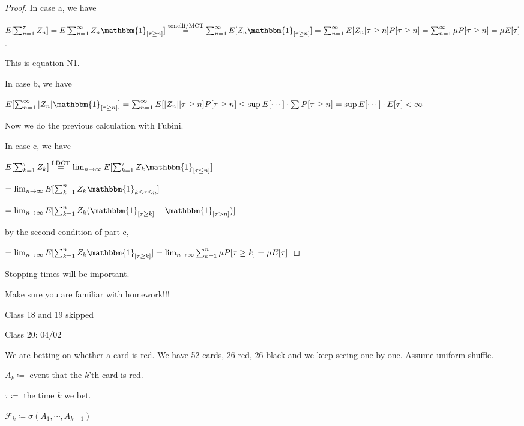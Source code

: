 \documentclass{article}
\theoremstyle{definition}
\begin{document}
\begin{proof}
    In case a, we have

    \(E[\sum_{n=1}^{\tau} Z_n] = E[\sum_{n=1}^{\infty} Z_n \mathbbm{1}_{[\tau \geq n]}]\overset{\text{tonelli/MCT}}{=} \sum_{n=1}^{\infty} E[Z_n \mathbbm{1}_{[\tau \geq n]} ]=\sum_{n=1}^{\infty} E[Z_n|\tau \geq n]P[\tau \geq n]=\sum_{n=1}^{\infty} \mu P[\tau \geq n] = \mu E[\tau]\).

    This is equation N1.

    In case b, we have

    \(E[\sum_{n=1}^{\infty} \vert Z_n \vert \mathbbm{1}_{[\tau \geq n]}]=\sum_{n=1}^{\infty} E[\vert Z_n \vert | \tau \geq n]P[\tau \geq n]\leq \sup E[\cdots] \cdot \sum P[\tau \geq n] = \sup E[\cdots]\cdot E[\tau]<\infty \) 

    Now we do the previous calculation with Fubini.

    In case c, we have

    \(E[\sum_{k=1}^{\tau} Z_k]\overset{\text{LDCT}}{=} \lim_{n \to \infty} E[\sum_{k=1}^{\tau} Z_k \mathbbm{1}_{[\tau \leq n]}] \) 

    \(=\lim_{n \to \infty} E[\sum_{k=1}^{n} Z_k \mathbbm{1}_{k \leq \tau  \leq n}]\) 

    \(=\lim_{n \to \infty} E[\sum_{k=1}^n Z_k (\mathbbm{1}_{[\tau \geq k]} - \mathbbm{1}_{[\tau>n]}  )]\) 

    by the second condition of part c,

    \(=\lim_{n \to \infty} E[\sum_{k=1}^n Z_k \mathbbm{1}_{[\tau \geq k]}] = \lim_{n \to \infty} \sum_{k=1}^{n} \mu P[\tau \geq k] = \mu E[\tau] \) 

\end{proof}

Stopping times will be important.

Make sure you are familiar with homework!!!

\hrulefill

Class 18 and 19 skipped

\hrulefill

Class 20: 04/02

We are betting on whether a card is red. We have 52 cards, 26 red, 26 black and we keep seeing one by one. Assume uniform shuffle.

\(A_k \coloneqq\) event that the \(k\)'th card is red.

\(\tau\coloneqq\) the time \(k\) we bet.

\(\mathscr{F} _k \coloneqq \sigma (A_1,\cdots, A_{k-1})\) 
\end{document}
